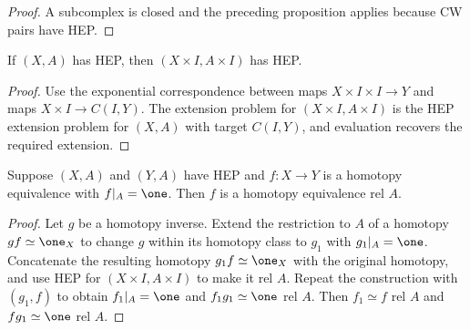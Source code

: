 \begin{proof}

\sketch A subcomplex is closed and the preceding proposition applies because CW
pairs have HEP.
\end{proof}

\begin{lemma}
\label{lem:hep-product-interval}





If $(X,A)$ has HEP, then $(X\times I,A\times I)$ has HEP.
\end{lemma}

\begin{proof}

\sketch Use the exponential correspondence between maps
$X\times I\times I\to Y$ and maps $X\times I\to C(I,Y)$. The extension problem
for $(X\times I,A\times I)$ is the HEP extension problem for $(X,A)$ with target
$C(I,Y)$, and evaluation recovers the required extension.
\end{proof}

\begin{proposition}
\label{prop:hep-homotopy-equivalence-rel-a}





Suppose $(X,A)$ and $(Y,A)$ have HEP and $f:X\to Y$ is a homotopy equivalence with
$f|_A=\one$. Then $f$ is a homotopy equivalence rel $A$.
\end{proposition}

\begin{proof}

\sketch Let $g$ be a homotopy inverse. Extend the restriction to $A$ of a homotopy
$gf\simeq\one_X$ to change $g$ within its homotopy class to $g_1$ with
$g_1|_A=\one$. Concatenate the resulting homotopy $g_1f\simeq\one_X$ with the
original homotopy, and use HEP for $(X\times I,A\times I)$ to make it rel $A$.
Repeat the construction with $(g_1,f)$ to obtain $f_1|_A=\one$ and
$f_1g_1\simeq\one$ rel $A$. Then $f_1\simeq f$ rel $A$ and
$fg_1\simeq\one$ rel $A$.
\end{proof}

